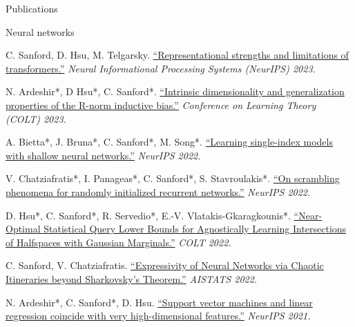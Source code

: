 \documentclass{resume} %
\begin{document}
\newpage
\begin{rSection}{Publications}
\begin{rSubsection}{Neural networks}{}{}{}{}

\item C. Sanford, D. Hsu, M. Telgarsky. \href{https://arxiv.org/abs/2306.02896}{``Representational strengths and limitations of transformers.''} \textit{Neural Informational Processing Systems (NeurIPS) 2023.}

\item N. Ardeshir*, D Hsu*, C. Sanford*. \href{https://proceedings.mlr.press/v195/ardeshir23a.html}{``Intrinsic dimensionality and generalization properties of the R-norm inductive bias.''} \textit{Conference on Learning Theory (COLT) 2023.}

\item A. Bietta*, J. Bruna*, C. Sanford*, M. Song*. \href{https://proceedings.neurips.cc/paper_files/paper/2022/hash/3fb6c52aeb11e09053c16eabee74dd7b-Abstract-Conference.html}{``Learning single-index models with shallow neural networks.''} \textit{NeurIPS 2022.}

\item V. Chatziafratis*, I. Panageas*, C. Sanford*, S. Stavroulakis*. \href{https://proceedings.neurips.cc/paper_files/paper/2022/hash/755acd0c7c07180d78959b6d89768207-Abstract-Conference.html}{``On scrambling phenomena for randomly initialized recurrent networks.''} \textit{NeurIPS 2022.}

\item D. Hsu*, C. Sanford*, R. Servedio*, E.-V. Vlatakis-Gkaragkounis*. \href{https://proceedings.mlr.press/v178/hsu22a.html}{``Near-Optimal Statistical Query Lower Bounds for Agnostically Learning Intersections of Halfspaces with Gaussian Marginals.''} \textit{COLT 2022.}

\item C. Sanford, V. Chatziafratis. \href{https://proceedings.mlr.press/v151/sanford22a.html}{``Expressivity of Neural Networks via Chaotic Itineraries beyond Sharkovsky's Theorem.''} \textit{AISTATS 2022.}

\item N. Ardeshir*, C. Sanford*, D. Hsu. \href{https://proceedings.neurips.cc/paper/2021/hash/26d4b4313a7e5828856bc0791fca39a2-Abstract.html}{``Support vector machines and linear regression coincide with very high-dimensional features.''} \textit{NeurIPS 2021.}


\end{rSubsection}
\end{rSection}
\end{document}
